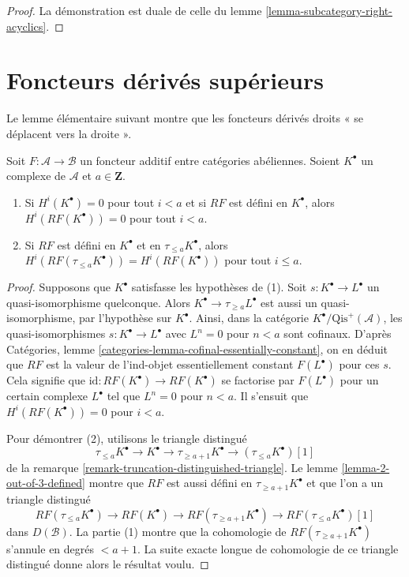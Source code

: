 \begin{proof}
La démonstration est duale de celle du
lemme \ref{lemma-subcategory-right-acyclics}.
\end{proof}







\section{Foncteurs dérivés supérieurs}
\label{section-higher-derived}

\noindent
Le lemme élémentaire suivant montre que les foncteurs dérivés droits « se
déplacent vers la droite ».

\begin{lemma}
\label{lemma-negative-vanishing}
Soit $F : \mathcal{A} \to \mathcal{B}$ un foncteur additif entre catégories
abéliennes. Soient $K^\bullet$ un complexe de $\mathcal{A}$ et
$a \in \mathbf{Z}$.
\begin{enumerate}
\item Si $H^i(K^\bullet) = 0$ pour tout $i < a$ et si $RF$ est défini en
$K^\bullet$, alors $H^i(RF(K^\bullet)) = 0$ pour tout $i < a$.
\item Si $RF$ est défini en $K^\bullet$ et en
$\tau_{\leq a}K^\bullet$, alors
$H^i(RF(\tau_{\leq a}K^\bullet)) = H^i(RF(K^\bullet))$ pour tout $i \leq a$.
\end{enumerate}
\end{lemma}

\begin{proof}
Supposons que $K^\bullet$ satisfasse les hypothèses de (1). Soit
$s : K^\bullet \to L^\bullet$ un quasi-isomorphisme quelconque. Alors
$K^\bullet \to \tau_{\geq a}L^\bullet$ est aussi un quasi-isomorphisme, par
l'hypothèse sur $K^\bullet$. Ainsi, dans la catégorie
$K^\bullet/\text{Qis}^{+}(\mathcal{A})$, les quasi-isomorphismes
$s : K^\bullet \to L^\bullet$ avec $L^n = 0$ pour $n < a$ sont cofinaux.
D'après Catégories, lemme
\ref{categories-lemma-cofinal-essentially-constant}, on en déduit que $RF$ est
la valeur de l'ind-objet essentiellement constant $F(L^\bullet)$ pour ces $s$.
Cela signifie que
$\text{id} : RF(K^\bullet) \to RF(K^\bullet)$ se factorise par
$F(L^\bullet)$ pour un certain complexe $L^\bullet$ tel que $L^n = 0$ pour
$n < a$. Il s'ensuit que $H^i(RF(K^\bullet)) = 0$ pour $i < a$.

\medskip\noindent
Pour démontrer (2), utilisons le triangle distingué
$$
\tau_{\leq a}K^\bullet \to K^\bullet \to \tau_{\geq a + 1}K^\bullet
\to (\tau_{\leq a}K^\bullet)[1]
$$
de la remarque \ref{remark-truncation-distinguished-triangle}. Le
lemme \ref{lemma-2-out-of-3-defined} montre que $RF$ est aussi défini en
$\tau_{\geq a + 1}K^\bullet$ et que l'on a un triangle distingué
$$
RF(\tau_{\leq a}K^\bullet) \to RF(K^\bullet) \to
RF(\tau_{\geq a + 1}K^\bullet)
\to RF(\tau_{\leq a}K^\bullet)[1]
$$
dans $D(\mathcal{B})$. La partie (1) montre que la cohomologie de
$RF(\tau_{\geq a + 1}K^\bullet)$ s'annule en degrés $< a + 1$. La suite exacte
longue de cohomologie de ce triangle distingué donne alors le résultat voulu.
\end{proof}

